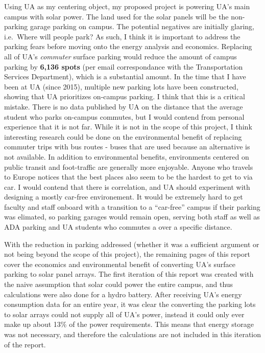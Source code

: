 \documentclass[11pt]{article}
\begin{document}
Using UA as my centering object, my proposed project is powering UA's
main campus with solar power. The land used for the solar panels will be
the non-parking garage parking on campus. The potential negatives are
initially glaring, i.e.~Where will people park? As such, I think it is
important to address the parking fears before moving onto the energy
analysis and economics. Replacing all of UA's \emph{commuter} surface
parking would reduce the amount of campus parking by \textbf{6,136
spots} (per email correspondance with the Transportation Services
Department), which is a substantial amount. In the time that I have been
at UA (since 2015), multiple new parking lots have been constructed,
showing that UA prioritizes on-campus parking. I think that this is a
critical mistake. There is no data published by UA on the distance that
the average student who parks on-campus commutes, but I would contend
from personal experience that it is not far. While it is not in the
scope of this project, I think interesting research could be done on the
environmental benefit of replacing commuter trips with bus routes -
buses that are used because an alternative is not available. In addition
to environmental benefits, environments centered on public transit and
foot-traffic are generally more enjoyable. Anyone who travels to Europe
notices that the best places also seem to be the hardest to get to via
car. I would contend that there is correlation, and UA should experiment
with designing a mostly car-free environement. It would be extremely
hard to get faculty and staff onboard with a transition to a
``car-free'' campus if their parking was elimated, so parking garages
would remain open, serving both staff as well as ADA parking and UA
students who commutes a over a specific distance.

With the reduction in parking addressed (whether it was a sufficient
argument or not being beyond the scope of this project), the remaining
pages of this report cover the economics and environmental benefit of
converting UA's surface parking to solar panel arrays. The first
iteration of this report was created with the naive assumption that
solar could power the entire campus, and thus calculations were also
done for a hydro battery. After receiving UA's energy consumption data
for an entire year, it was clear the converting the parking lots to
solar arrays could not supply all of UA's power, instead it could only
ever make up about 13\% of the power requirements. This means that
energy storage was not necessary, and therefore the calculations are not
included in this iteration of the report.
\end{document}
